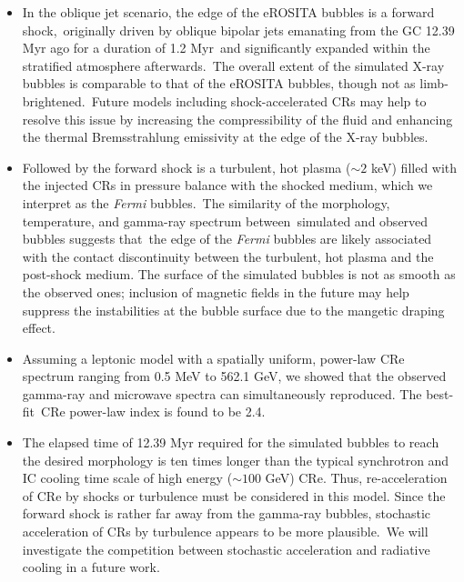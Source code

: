\documentclass[fleqn,usenatbib,useAMS]{mnras}
\begin{document}
\begin{itemize}
\item In the oblique jet scenario, the edge of the eROSITA bubbles is a forward shock,\
      originally driven by oblique bipolar jets emanating from the GC 12.39 Myr ago for a duration of 1.2 Myr\
      and significantly expanded within the stratified atmosphere afterwards.\
      The overall extent of the simulated X-ray bubbles is comparable to that of the eROSITA bubbles, though not as limb-brightened.\
      Future models including shock-accelerated CRs may help to resolve this issue by increasing the compressibility of the fluid and enhancing the thermal Bremsstrahlung emissivity at the edge of the X-ray bubbles.
\item Followed by the forward shock is a turbulent, hot plasma ($\sim2$ keV) filled with the injected CRs in pressure balance with the shocked medium, which we interpret as the \textit{Fermi} bubbles.\
      The similarity of the morphology, temperature, and gamma-ray spectrum between\
      simulated and observed bubbles suggests that\
      the edge of the \textit{Fermi} bubbles are likely associated with the contact discontinuity between the turbulent, hot plasma and the post-shock medium. The surface of the simulated bubbles is not as smooth as the observed ones; inclusion of magnetic fields in the future may help suppress the instabilities at the bubble surface due to the mangetic draping effect.
\item Assuming a leptonic model with a spatially uniform, power-law CRe spectrum ranging from 0.5 MeV to 562.1 GeV, we showed that the observed gamma-ray and microwave spectra can simultaneously reproduced. The best-fit\
      CRe power-law index is found to be 2.4.
\item The elapsed time of 12.39 Myr required for the simulated bubbles
      to reach the desired morphology
      is ten times longer than the typical synchrotron and IC cooling time scale of
      high energy ($\sim100$ GeV) CRe. Thus, re-acceleration of CRe by shocks or turbulence must be considered
      in this model. Since the forward shock is rather far away from the gamma-ray bubbles, stochastic acceleration of CRs by turbulence appears to be more plausible.\
      We will investigate the competition between stochastic acceleration and radiative cooling
      in a future work.
\end{itemize}
\end{document}
